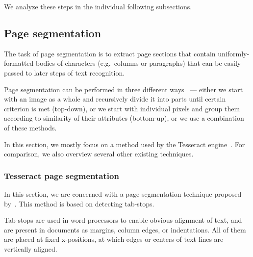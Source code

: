 We analyze these steps in the individual following subsections.

\subsection{Page segmentation} \label{pageSegmentation}

The task of page segmentation is to extract page sections that contain uniformly-formatted bodies of characters (e.g.~columns or paragraphs) that can be easily passed to later steps of text recognition.

Page segmentation can be performed in three different ways~\citep{segmentationOverview} --- either we start with an image as a whole and recursively divide it into parts until certain criterion is met (top-down), or we start with individual pixels and group them according to similarity of their attributes (bottom-up), or we use a combination of these methods.

In this section, we mostly focus on a method used by the Tesseract engine~\cite{tesseractSegmentationTab}. For comparison, we also overview several other existing techniques.

\subsubsection{Tesseract page segmentation} \label{sectionTessPageSegm}

In this section, we are concerned with a page segmentation technique proposed by~\citet{tesseractSegmentationTab}. This method is based on detecting tab-stops.

Tab-stops are used in word processors to enable obvious alignment of text, and are present in documents as margins, column edges, or indentations. All of them are placed at fixed x-positions, at which edges or centers of text lines are vertically aligned.

